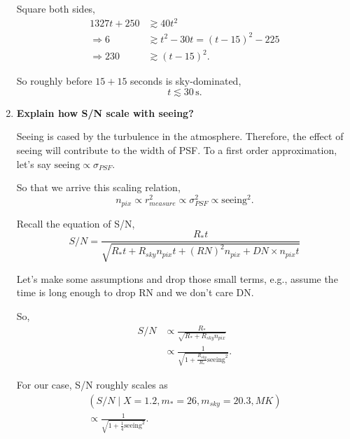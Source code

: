 \documentclass[12pt,letterpaper]{article}
\begin{document}
\begin{enumerate}
    Square both sides,
    \begin{equation*}
        \begin{split}
        1327t + 250         &\gtrsim 40 t^2 \\
            \Rightarrow 6   &\gtrsim t^2 - 30t = (t - 15)^2 - 225\\
            \Rightarrow 230 &\gtrsim (t - 15)^2.
        \end{split}
    \end{equation*}

    So roughly before $15 + 15$ seconds is sky-dominated,
    \begin{equation}
        t \lesssim 30 \, \mathrm{s}.
    \end{equation}


    \item {\bf Explain how S/N scale with seeing?}
    
    Seeing is cased by the turbulence in the atmosphere.
    Therefore, the effect of seeing will contribute to the width of PSF.
    To a first order approximation, let's say $\mathrm{seeing} \propto \sigma_{PSF}$.

    So that we arrive this scaling relation,
    \begin{equation}
        n_{pix} \propto r_{measure}^2 
            \propto \sigma_{PSF}^2 
            \propto \mathrm{seeing}^2.
    \end{equation}

    Recall the equation of S/N,
    \begin{equation}
        S/N = \frac{ R_* t }{ \sqrt{ R_* t + R_{sky} n_{pix} t + (RN)^2 n_{pix} + DN\times n_{pix} t } }
    \end{equation}

    Let's make some assumptions and drop those small terms, e.g., 
    assume the time is long enough to drop RN and we don't care DN.

    So,
    \begin{equation}
        \begin{split}
            S/N &\propto \frac{ R_* }{ \sqrt{ R_* + R_{sky} n_{pix} } }\\
                &\propto \frac{1}{\sqrt{ 1 + \frac{R_{sky}}{R_*} \mathrm{seeing}^2 }}.
        \end{split}
    \end{equation}

    For our case, S/N roughly scales as 
    \begin{equation}
        \begin{split}
            (S/N \mid X=1.2, m_*=26, m_{sky}=20.3, MK)\\
                 \propto \frac{1}{\sqrt{ 1 + \frac{1}{4} \mathrm{seeing}^2 }}.
        \end{split}
    \end{equation}


\end{enumerate}
\end{document}
